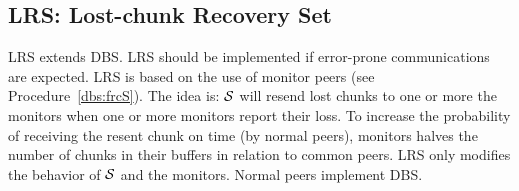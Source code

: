 \subsection{LRS: Lost-chunk Recovery Set}
\label{sec:LRS}
LRS extends DBS. LRS should be implemented if error-prone
communications are expected. LRS is based on the use of monitor peers
(see Procedure~\ref{dbs:frcS}). The idea is: ${\cal S}$ will resend
lost chunks to one or more the monitors when one or more monitors
report their loss. To increase the probability of receiving the resent
chunk on time (by normal peers), monitors halves the number of chunks
in their buffers in relation to common peers. LRS only modifies the
behavior of ${\cal S}$ and the monitors. Normal peers implement DBS.

\begin{comment}
LRS should be used when it is expected to have loss-prone
communication links or when the bit-rate of the stream exceeds the
uploading capacity of the nodes. Notice that the impact of using LSR
for normal peers is null.

P2PSP relies in UDP to transmit the chunks, and obviously, packet
losses can happen. The impact of a packet loss in the QoS provided
depends on where the packets are lost and who lost it. If a packet is
lost in its trip between the splitter and a peer, this packet will be
missed by all the team.

\subsubsection{Monitor peers}
The overlay administrator can create some special peers called, in
short,\emph{monitors}. These peers are introduced to the rest of peers
of the team as normal peers and behave like the rest of well-intended
peers, churn included. Monitor peers can be asked by the splitter to
check whether the operation of the team has and is been correct.

\subsubsection{Selfish peers rejection}
Another functionality of monitors is to tell the splitter which chunks
have not been received on time (the consequence of receiving a lost
too late is the same than not receiving it never). The splitter
memorizes which chunk has been sent to each peer in the current
round. If all monitors reports that a chunk has been lost, the
splitter can determine which peer has been in charge of broadcasting
that chunk and take note of this. If this problem happens a given
number of times, the splitter can expell the unreliable peer from the
team by stop sending to it futher chunks.


\end{comment}
